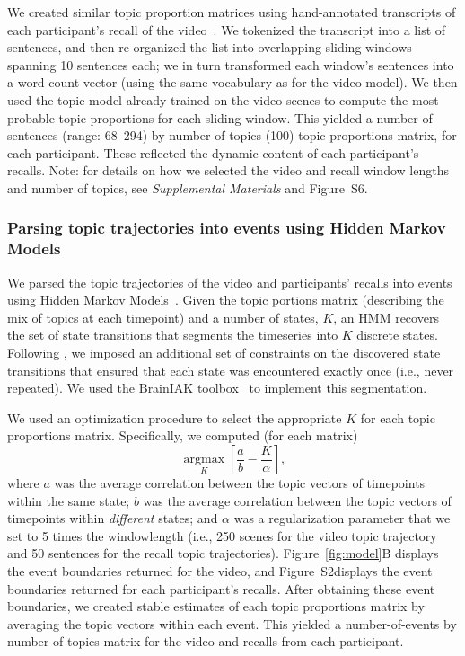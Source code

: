 \documentclass{article}
\newcommand{\argmax}{\mathop{\mathrm{argmax}}\limits}
\newcommand{\corrmats}{S2}
\newcommand{\topicopt}{S6}
\begin{document}
We created similar topic proportion matrices using hand-annotated transcripts of each participant's recall of the video~\citep[annotated by ][]{ChenEtal17}.  We tokenized the transcript into a list of sentences, and then re-organized the list into overlapping sliding windows spanning 10 sentences each; we in turn transformed each window's sentences into a word count vector (using the same vocabulary as for the video model).  We then used the topic model already trained on the video scenes to compute the most probable topic proportions for each sliding window.  This yielded a number-of-sentences (range: 68--294) by number-of-topics (100) topic proportions matrix, for each participant.  These reflected the dynamic content of each participant's recalls.  Note: for details on how we selected the video and recall window lengths and number of topics, see \textit{Supplemental Materials} and Figure~\topicopt.

\subsubsection*{Parsing topic trajectories into events using Hidden Markov Models}
We parsed the topic trajectories of the video and participants' recalls into events using Hidden Markov Models~\citep{Rabi89}.  Given the topic portions matrix (describing the mix of topics at each timepoint) and a number of states, $K$, an HMM recovers the set of state transitions that segments the timeseries into $K$ discrete states.  Following \cite{BaldEtal17}, we imposed an additional set of constraints on the discovered state transitions that ensured that each state was encountered exactly once (i.e., never repeated).  We used the BrainIAK toolbox~\citep{Brainiak} to implement this segmentation.

We used an optimization procedure to select the appropriate $K$ for each topic proportions matrix.  Specifically, we computed (for each matrix)
\[
  \argmax_K \left[\frac{a}{b} - \frac{K}{\alpha}\right],
\]
where $a$ was the average correlation between the topic vectors of timepoints within the same state; $b$ was the average correlation between the topic vectors of timepoints within \textit{different} states; and $\alpha$ was a regularization parameter that we set to 5 times the windowlength (i.e., 250 scenes for the video topic trajectory and 50 sentences for the recall topic trajectories).  Figure~\ref{fig:model}B displays the event boundaries returned for the video, and Figure~\corrmats displays the event boundaries returned for each participant's recalls.  After obtaining these event boundaries, we created stable estimates of each topic proportions matrix by averaging the topic vectors within each event.  This yielded a number-of-events by number-of-topics matrix for the video and recalls from each participant.
\end{document}

